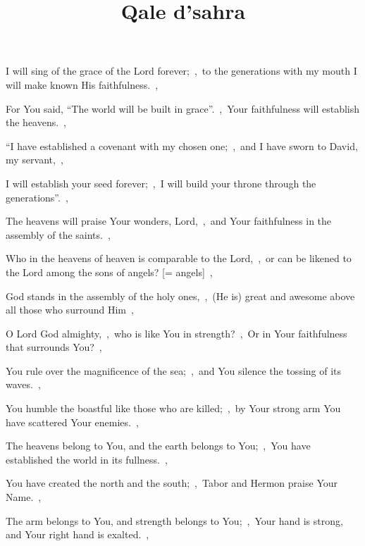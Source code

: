 \documentclass[12pt,twoside,a5paper]{article}
\begin{document}

\newpage
\title{Qale d'sahra}
\inlinemaketitle


\begin{halfparskip}
   I will sing of the grace of the Lord forever;~\sep\ to the generations with my mouth I will make known His faithfulness.~\sep


  For You said, ``The world will be built in grace''.~\sep\ Your faithfulness will establish the heavens.~\sep

  ``I have established a covenant with my chosen one;~\sep\ and I have sworn to David, my servant,~\sep

  I will establish your seed forever;~\sep\ I will build your throne through the generations''.~\sep

  The heavens will praise Your wonders, Lord,~\sep\ and Your faithfulness in the assembly of the saints.~\sep

  Who in the heavens of heaven is comparable to the Lord,~\sep\ or can be likened to the Lord among the sons of angels? [= angels]~\sep

  God stands in the assembly of the holy ones,~\sep\ (He is) great and awesome above all those who surround Him~\sep

  O Lord God almighty,~\sep\ who is like You in strength?~\sep\ Or in Your faithfulness that surrounds You?~\sep

  You rule over the magnificence of the sea;~\sep\ and You silence the tossing of its waves.~\sep

  You humble the boastful like those who are killed;~\sep\ by Your strong arm You have scattered Your enemies.~\sep

  The heavens belong to You, and the earth belongs to You;~\sep\ You have established the world in its fullness.~\sep

  You have created the north and the south;~\sep\ Tabor and Hermon praise Your Name.~\sep

  The arm belongs to You, and strength belongs to You;~\sep\ Your hand is strong, and Your right hand is exalted.~\sep


\end{halfparskip}
\end{document}
